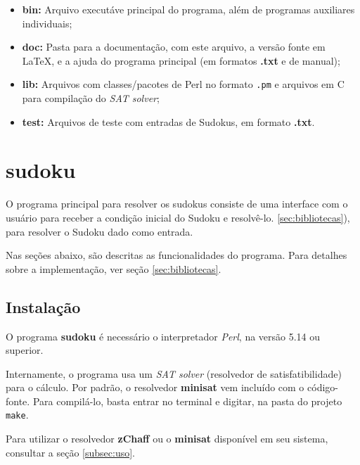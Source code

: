 \documentclass[a4paper]{article}
\begin{document}
    \begin{itemize}
      \item \textbf{bin:}  Arquivo executáve principal do programa, além
                           de programas auxiliares individuais;
      \item \textbf{doc:}  Pasta para a documentação, com este arquivo, 
                           a versão fonte em \LaTeX, e a ajuda do programa
                           principal (em formatos \textbf{.txt} e de manual);
      \item \textbf{lib:}  Arquivos com classes/pacotes de Perl no formato
                           \texttt{.pm} e arquivos em C para compilação do
                           \emph{SAT solver};
      \item \textbf{test:} Arquivos de teste com entradas de Sudokus, em
                           formato \textbf{.txt}.
    \end{itemize}
    
\newpage %

\section{sudoku}
\label{sec:sudoku}

  O programa principal para resolver os sudokus consiste de uma interface
  com o usuário para receber a condição inicial do Sudoku e resolvê-lo. 
  \ref{sec:bibliotecas}), para resolver o Sudoku dado como entrada.
  
  Nas seções abaixo, são descritas as funcionalidades do programa.
  Para detalhes sobre a implementação, ver seção \ref{sec:bibliotecas}.
    
  \subsection{Instalação}
  \label{subsec:instalacao}
  
    O programa \textbf{sudoku} é necessário o interpretador \emph{Perl},
    na versão 5.14 ou superior.
    
    Internamente, o programa usa um \emph{SAT solver} (resolvedor de 
    satisfatibilidade) para o cálculo. Por padrão, o resolvedor 
    \textbf{minisat} vem incluído com o código-fonte. Para compilá-lo,
    basta entrar no terminal e digitar, na pasta do projeto \texttt{make}.
    
    Para utilizar o resolvedor \textbf{zChaff} ou o \textbf{minisat}
    disponível em seu sistema, consultar a seção \ref{subsec:uso}.
  
\end{document}
